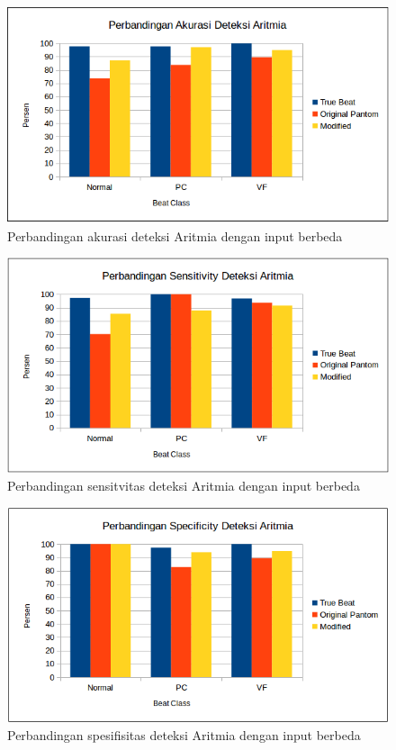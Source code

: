 \begin{figure}[H]
	\centering
	\includegraphics[scale=0.7]{images/aritmia_acc.png}
	\caption{Perbandingan akurasi deteksi Aritmia dengan input berbeda}
	\label{fig:aritmia_accuracy}
\end{figure}
\begin{figure}[H]
	\centering
	\includegraphics[scale=0.7]{images/aritmia_se.png}
	\caption{Perbandingan sensitvitas deteksi Aritmia dengan input berbeda}
	\label{fig:aritmia_sensitivity}
\end{figure}
\begin{figure}[H]
	\centering
	\includegraphics[scale=0.7]{images/aritmia_sp.png}
	\caption{Perbandingan spesifisitas deteksi Aritmia dengan input berbeda}
	\label{fig:aritmia_specificity}
\end{figure}

